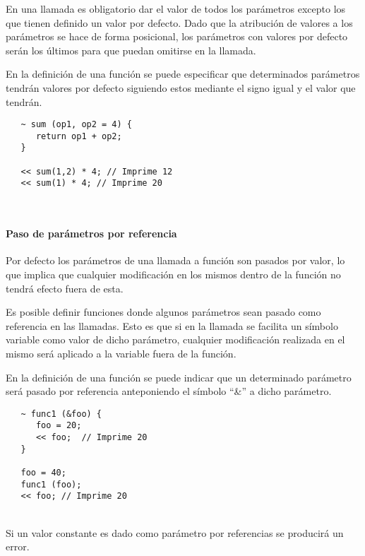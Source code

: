 En una llamada es obligatorio dar el valor de todos los parámetros excepto los que tienen definido un valor por defecto. Dado que la 
atribución de valores a los parámetros se hace de forma posicional, los parámetros con valores por defecto serán los últimos
para que puedan omitirse en la llamada. 

En la definición de una función se puede especificar que determinados parámetros tendrán valores por defecto siguiendo estos mediante el 
signo igual y el valor que tendrán. \\


\begin{lstlisting}
   ~ sum (op1, op2 = 4) { 
      return op1 + op2;
   }
   
   << sum(1,2) * 4; // Imprime 12
   << sum(1) * 4; // Imprime 20
\end{lstlisting} 
\hfill\\ 

\paragraph{Paso de parámetros por referencia} \label{sec:func_ref}
Por defecto los parámetros de una llamada a función son pasados por valor, lo que implica que cualquier modificación 
en los mismos dentro de la función no tendrá efecto fuera de esta. 

Es posible definir funciones donde algunos parámetros sean pasado como referencia en las llamadas. Esto es que si
en la llamada se facilita un símbolo variable como valor de dicho parámetro, cualquier modificación realizada 
en el mismo será aplicado a la variable fuera de la función. 

En la definición de una función se puede indicar que un determinado parámetro será pasado por referencia anteponiendo
el símbolo ``\&'' a dicho parámetro. \\

\begin{lstlisting}
   ~ func1 (&foo) { 
      foo = 20;
      << foo;  // Imprime 20
   }
   
   foo = 40;
   func1 (foo);
   << foo; // Imprime 20
\end{lstlisting}
\hfill\\ 

Si un valor constante es dado como parámetro por referencias se producirá un error.


